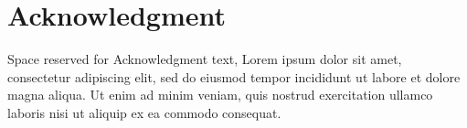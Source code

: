\documentclass[conference]{IEEEtran}
\begin{document}
\section*{Acknowledgment}
Space reserved for Acknowledgment text, Lorem ipsum dolor sit amet, consectetur adipiscing elit,
sed do eiusmod tempor incididunt ut labore et dolore magna aliqua. Ut enim ad minim veniam, quis 
nostrud exercitation ullamco laboris nisi ut aliquip ex ea commodo consequat.




\end{document}
